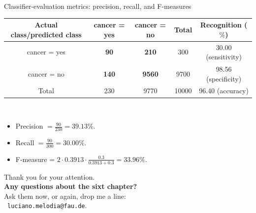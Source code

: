 \documentclass[aspectratio=169,t,table]{beamer}
\begin{document}
  {
    \begin{frame}{Classifier-evaluation metrics: precision, recall, and F-measures}
      \centering
      \begin{tabular}{|c|c|c|c|c|}
        \hline
        Actual class/predicted class & cancer = yes & cancer = no & Total & Recognition ($\%$) \\\hline
        cancer = yes & \textbf{90} & \textbf{210} & 300 & 30.00 (sensitivity) \\\hline
        cancer = no & \textbf{140} & \textbf{9560} & 9700 & 98.56 (specificity) \\\hline
        Total & 230 & 9770 & 10000 & 96.40 (accuracy) \\\hline
      \end{tabular}\\[0.2cm]
      \begin{itemize}
        \item Precision $= \frac{90}{230} = 39.13 \%$.
        \item Recall $=\frac{90}{300} = 30.00 \%$.
        \item F-measure = $2 \cdot 0.3913 \cdot \frac{0.3}{0.3913 + 0.3} = 33.96 \%$.
      \end{itemize}
    \end{frame}
  }

  { %
    \begin{frame}[c]
      \begin{center}
        Thank you for your attention.\\
        {\bf Any questions about the sixt chapter?}\\[0.5cm]
        Ask them now, or again, drop me a line: \\
        \faSendO \ \texttt{luciano.melodia@fau.de}.
      \end{center}
    \end{frame}
  }
\end{document}
